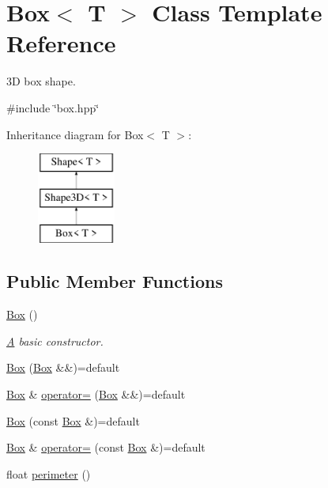 \hypertarget{classBox}{}\section{Box$<$ T $>$ Class Template Reference}
\label{classBox}


3D box shape.  




{\ttfamily \#include \char`\"{}box.\+hpp\char`\"{}}

Inheritance diagram for Box$<$ T $>$\+:\begin{figure}[H]
\begin{center}
\leavevmode
\includegraphics[height=3.000000cm]{classBox}
\end{center}
\end{figure}
\subsection*{Public Member Functions}
\begin{DoxyCompactItemize}
\item 
\mbox{\hyperlink{classBox_a057f84d8fa68647c6484d4e004d8ab74}{Box}} ()
\begin{DoxyCompactList}\small\item\em \mbox{\hyperlink{classA}{A}} basic constructor. \end{DoxyCompactList}\item 
\mbox{\hyperlink{classBox_af72b67fa2f421acbe9a7d3d1bcd540d1}{Box}} (\mbox{\hyperlink{classBox}{Box}} \&\&)=default
\item 
\mbox{\hyperlink{classBox}{Box}} \& \mbox{\hyperlink{classBox_a09995e3360b336b8a477d84804a5a70d}{operator=}} (\mbox{\hyperlink{classBox}{Box}} \&\&)=default
\item 
\mbox{\hyperlink{classBox_aab49a6687d04530ec60421bcbdb929c2}{Box}} (const \mbox{\hyperlink{classBox}{Box}} \&)=default
\item 
\mbox{\hyperlink{classBox}{Box}} \& \mbox{\hyperlink{classBox_a6ea0d233bdcce789b46384d22601da8d}{operator=}} (const \mbox{\hyperlink{classBox}{Box}} \&)=default
\item 
float \mbox{\hyperlink{classBox_ac64e9d619b0f3b991174a2ac49fef899}{perimeter}} ()
\end{DoxyCompactItemize}
